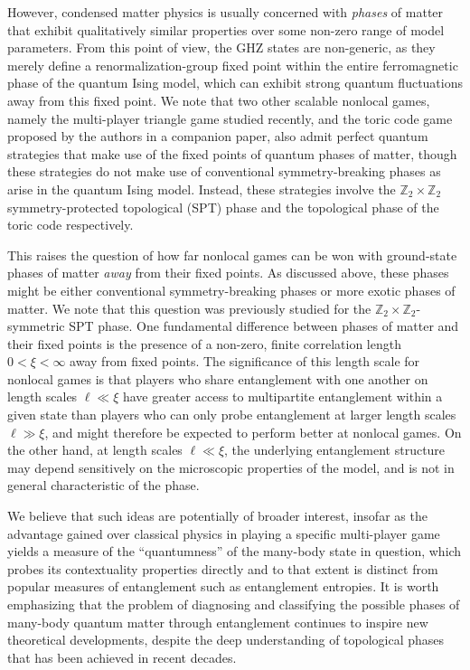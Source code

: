 \documentclass[prb,twocolumn,showpacs,amssymb,superscriptaddress]{revtex4-2}
\begin{document}
However, condensed matter physics is usually concerned with \emph{phases} of matter that exhibit qualitatively similar properties over some non-zero range of model parameters. From this point of view, the GHZ states are non-generic, as they merely define a renormalization-group fixed point within the entire ferromagnetic phase of the quantum Ising model, which can exhibit strong quantum fluctuations away from this fixed point. We note that two other scalable nonlocal games, namely the multi-player triangle game\cite{Cluster,Bravyi} studied recently\cite{DanielMiyake}, and the toric code game proposed by the authors in a companion paper\cite{companion}, also admit perfect quantum strategies that make use of the fixed points of quantum phases of matter, though these strategies do not make use of conventional symmetry-breaking phases as arise in the quantum Ising model. Instead, these strategies involve the $\mathbb{Z}_2 \times \mathbb{Z}_2$ symmetry-protected topological (SPT) phase and the topological phase of the toric code respectively.

This raises the question of how far nonlocal games can be won with ground-state phases of matter \emph{away} from their fixed points. As discussed above, these phases might be either conventional symmetry-breaking phases or more exotic phases of matter. We note that this question was previously studied for the $\mathbb{Z}_2 \times \mathbb{Z}_2$-symmetric SPT phase\cite{DanielMiyake}. One fundamental difference between phases of matter and their fixed points is the presence of a non-zero, finite correlation length $0<\xi<\infty$ away from fixed points. The significance of this length scale for nonlocal games is that players who share entanglement with one another on length scales $\ell \ll \xi$ have greater access to multipartite entanglement within a given state than players who can only probe entanglement at larger length scales $\ell \gg \xi$, and might therefore be expected to perform better at nonlocal games. On the other hand, at length scales $\ell \ll \xi$, the underlying entanglement structure may depend sensitively on the microscopic properties of the model, and is not in general characteristic of the phase.

We believe that such ideas are potentially of broader interest, insofar as the advantage gained over classical physics in playing a specific multi-player game yields a measure of the ``quantumness'' of the many-body state in question, which probes its contextuality properties directly\cite{Abramsky2017} and to that extent is distinct\cite{EntUseless,ContextualityMagic} from popular measures of entanglement such as entanglement entropies. It is worth emphasizing that the problem of diagnosing and classifying the possible phases of many-body quantum matter through entanglement continues to inspire new theoretical developments\cite{kim2021chiral,siva2021universal}, despite the deep understanding of topological phases that has been achieved in recent decades\cite{StringNet,KitaevPreskill,DetStringNet,EntSpec,3d_class,SPTClass,Kane_2005,Moore_2007}. 
\end{document}
